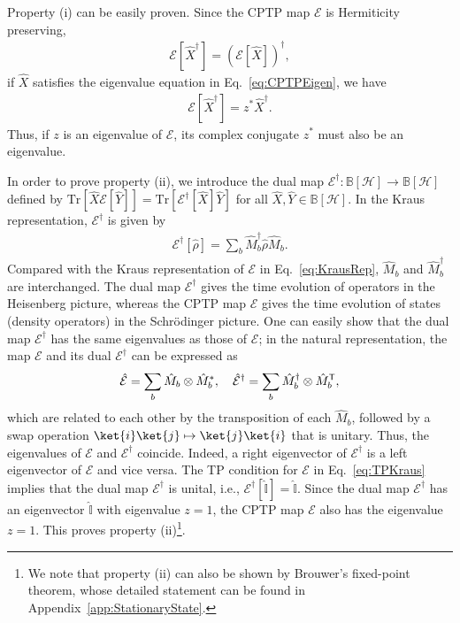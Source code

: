 \documentclass[preprint,pteplogo]{ptephy_v2}%
\numberwithin{equation}{section}
\theoremstyle{definition}
\newcommand{\mc}[1]{\mathcal{#1}}
\newcommand{\mr}[1]{\mathrm{#1}}
\newcommand{\mbb}[1]{\mathbb{#1}}
\newcommand{\Tr}{\mr{Tr}}
\begin{document}
Property (i) can be easily proven.
Since the CPTP map $\mc{E}$ is Hermiticity preserving,
\begin{align}
\mc{E}[\hat{X}^\dagger] = (\mc{E}[\hat{X}])^\dagger,
\end{align}
if $\hat{X}$ satisfies the eigenvalue equation in Eq.~\eqref{eq:CPTPEigen}, we have 
\begin{align}
\mc{E}[\hat{X}^\dagger] = z^* \hat{X}^\dagger.
\end{align}
Thus, if $z$ is an eigenvalue of $\mc{E}$, its complex conjugate $z^*$ must also be an eigenvalue.

In order to prove property (ii), we introduce the dual map $\mc{E}^\dagger: \mbb{B}[\mc{H}] \to \mbb{B}[\mc{H}]$ defined by $\Tr[\hat{X} \mc{E}[\hat{Y}]] = \Tr[\mc{E}^\dagger[\hat{X}] \hat{Y}]$ for all $\hat{X}, \hat{Y} \in \mbb{B}[\mc{H}]$. 
In the Kraus representation, $\mc{E}^\dagger$ is given by
\begin{align} \label{eq:DualMap}
\mc{E}^\dagger[\hat{\rho}] = \sum_b \hat{M}_b^\dagger \hat{\rho} \hat{M}_b.
\end{align}
Compared with the Kraus representation of $\mc{E}$ in Eq.~\eqref{eq:KrausRep}, $\hat{M}_b$ and $\hat{M}_b^\dagger$ are interchanged. 
The dual map $\mc{E}^\dagger$ gives the time evolution of operators in the Heisenberg picture, whereas the CPTP map $\mc{E}$ gives the time evolution of states (density operators) in the Schr\"{o}dinger picture.
One can easily show that the dual map $\mc{E}^\dagger$ has the same eigenvalues as those of $\mc{E}$; in the natural representation, the map $\mc{E}$ and its dual $\mc{E}^\dagger$ can be expressed as
\begin{align} \label{eq:CPTPNaturalRep}
\hat{\mc{E}} = \sum_b \hat{M}_b \otimes \hat{M}_b^*, \quad 
\hat{\mc{E}}^\dagger = \sum_b \hat{M}_b^\dagger \otimes \hat{M}_b^{\sf{T}},
\end{align}
which are related to each other by the transposition of each $\hat{M}_b$, followed by a swap operation $\ket{i} \ket{j} \mapsto \ket{j} \ket{i}$ that is unitary. 
Thus, the eigenvalues of $\mc{E}$ and $\mc{E}^\dagger$ coincide.
Indeed, a right eigenvector of $\mc{E}^\dagger$ is a left eigenvector of $\mc{E}$ and vice versa.
The TP condition for $\mc{E}$ in Eq.~\eqref{eq:TPKraus} implies that the dual map $\mc{E}^\dagger$ is unital, i.e., $\mc{E}^\dagger[\hat{\mbb{I}}] = \hat{\mbb{I}}$. 
Since the dual map $\mc{E}^\dagger$ has an eigenvector $\hat{\mbb{I}}$ with eigenvalue $z=1$, the CPTP map $\mc{E}$ also has the eigenvalue $z=1$. 
This proves property (ii)\footnote{
We note that property (ii) can also be shown by Brouwer's fixed-point theorem, whose detailed statement can be found in Appendix~\ref{app:StationaryState}.
}.
\end{document}
